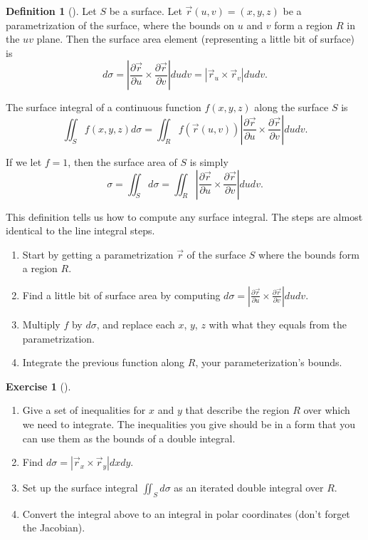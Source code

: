 \documentclass[10pt,]{book}
\theoremstyle{plain}
\theoremstyle{definition}
\newtheorem{definition}[theorem]{Definition}
\theoremstyle{definition}
\theoremstyle{definition}
\theoremstyle{definition}
\newtheorem{exploration}[project]{Exercise}
\theoremstyle{definition}
\numberwithin{equation}{section}
\begin{document}
\begin{definition}[{}]\label{definition-45}
Let \(S\) be a surface. Let \(\vec r(u,v)=(x,y,z)\) be a parametrization of the surface, where the bounds on \(u\) and \(v\) form a region \(R\) in the \(uv\) plane. Then the surface area element (representing a little bit of surface) is%
\begin{equation*}
d\sigma =\left |\frac{\partial \vec r}{\partial u} \times \frac{\partial \vec r}{\partial v}\right| dudv = \left|\vec r_u\times\vec r_v\right|dudv.
\end{equation*}
%
\par
The surface integral of a continuous function \(f(x,y,z)\) along the surface \(S\) is%
\begin{equation*}
\iint_S f(x,y,z) d\sigma = \iint_R f(\vec r(u,v)) \left |\frac{\partial \vec r}{\partial u} \times \frac{\partial \vec r}{\partial v}\right| dudv.
\end{equation*}
%
\par
If we let \(f=1\), then the surface area of \(S\) is simply%
\begin{equation*}
\sigma = \iint_S d\sigma = \iint_R \left |\frac{\partial \vec r}{\partial u} \times \frac{\partial \vec r}{\partial v}\right| dudv.
\end{equation*}
%
\end{definition}
This definition tells us how to compute any surface integral. The steps are almost identical to the line integral steps. \leavevmode%
\begin{enumerate}
\item\hypertarget{li-201}{}Start by getting a parametrization \(\vec r\) of the surface \(S\) where the bounds form a region \(R\).%
\item\hypertarget{li-202}{}Find a little bit of surface area by computing \(d\sigma =\left |\frac{\partial \vec r}{\partial u} \times \frac{\partial \vec r}{\partial v}\right| dudv.\)%
\item\hypertarget{li-203}{}Multiply \(f\) by \(d\sigma\), and replace each \(x\), \(y\), \(z\) with what they equals from the parametrization.%
\item\hypertarget{li-204}{}Integrate the previous function along \(R\), your parameterization's bounds.%
\end{enumerate}
%
\begin{exploration}[]\label{exploration-276}
\leavevmode%
\begin{enumerate}[font=\bfseries,label=(\alph*),ref=\alph*]
\item\label{task-749} Give a set of inequalities for \(x\) and \(y\) that describe the region \(R\) over which we need to integrate. The inequalities you give should be in a form that you can use them as the bounds of a double integral.%
\item\label{task-750} Find \(d\sigma = \left|\vec r_x\times \vec r_y\right|dxdy\).%
\item\label{task-751} Set up the surface integral \(\iint_S d\sigma\) as an iterated double integral over \(R\).%
\item\label{task-752} Convert the integral above to an integral in polar coordinates (don't forget the Jacobian).%
\end{enumerate}
\end{exploration}
\end{document}
